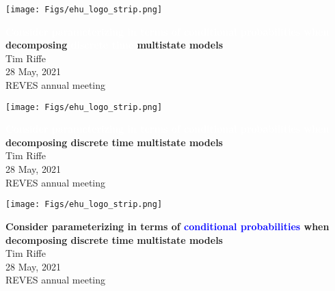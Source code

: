 \documentclass[20pt,usenames,dvipsnames]{beamer}
\newcommand{\white}[1]{\textcolor{white}{#1}}
\newcommand{\blue}[1]{\textcolor{blue}{#1}}
\begin{document}

\begin{frame}[plain]
	\vspace{-.5cm}
 \centerline{\texttt{[image: Figs/ehu\_logo\_strip.png]}}

	
	\huge
	\vspace{1em}
	\textbf{\white{Consider parameterizing in terms of conditional probabilities when} decomposing \white{discrete time} multistate models}\\
	\vspace{1em}
	\large 
	Tim Riffe \\
	\vspace{1em}
	28 May, 2021\\
	REVES annual meeting
\end{frame}

\begin{frame}[plain]
	\vspace{-.5cm}
 \centerline{\texttt{[image: Figs/ehu\_logo\_strip.png]}}

	
	\huge
	\vspace{1em}
	\textbf{\white{Consider parameterizing in terms of conditional probabilities when} decomposing discrete time multistate models}\\
	\vspace{1em}
	\large 
	Tim Riffe \\
	\vspace{1em}
	28 May, 2021\\
	REVES annual meeting
\end{frame}



\begin{frame}[plain]
	\vspace{-.5cm}
 \centerline{\texttt{[image: Figs/ehu\_logo\_strip.png]}}

	
	\huge
	\vspace{1em}
	
	\textbf{Consider parameterizing in terms of \blue{conditional probabilities} when decomposing discrete time multistate models}\\
	\vspace{1em}
	\large 
	Tim Riffe \\
	\vspace{1em}
	28 May, 2021\\
	REVES annual meeting
\end{frame}
\end{document}
